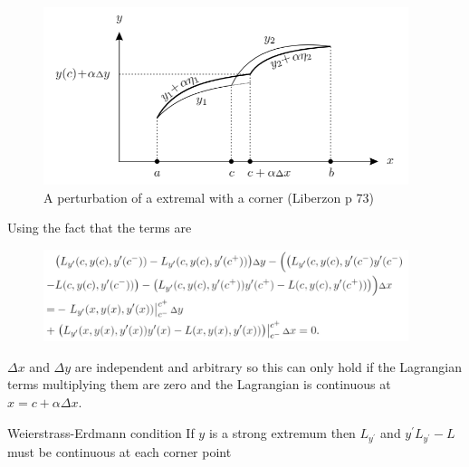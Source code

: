 \documentclass{beamer}
\begin{document}
    \begin{frame}
        \begin{figure}[!htb]
            \centering
            \includegraphics[width=0.95\textwidth]{img/extremalwtcorner.png}
            \caption{A perturbation of a extremal with a corner (Liberzon p 73)}
        \end{figure}
    \end{frame}

    \begin{frame}
        Using the fact that the terms are
        \begin{figure}[!htb]
        	\centering
        	\includegraphics[width=0.95\textwidth]{ch3/WEcorner.png}
        \end{figure}
        $\Delta x $ and $\Delta y$ are independent and arbitrary so this can only hold if the Lagrangian terms multiplying them are zero and the Lagrangian is continuous at $x = c + \alpha \Delta x$.
        \begin{theorem}{Weierstrass-Erdmann condition}
            If $y$ is a strong extremum then $L_{y^\prime}$ and $y^{\prime}L_{y^\prime} - L$ must be continuous at each corner point
        \end{theorem}
    \end{frame}
\end{document}
